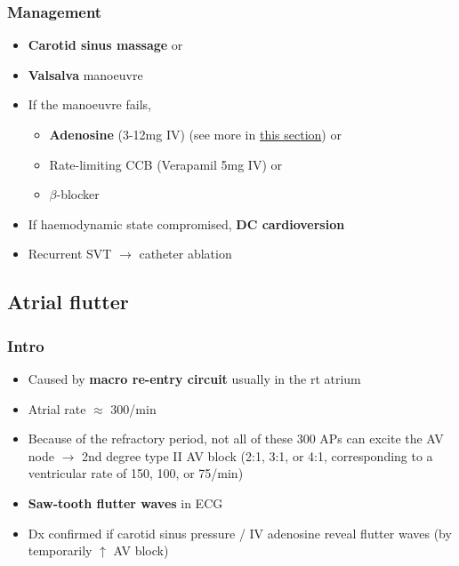 \documentclass[
  12pt,
]{memoir}
\providecommand{\tightlist}{%
  \setlength{\itemsep}{0pt}\setlength{\parskip}{0pt}}
\begin{document}
\hypertarget{management}{%
\subsubsection{Management}\label{management}}

\begin{itemize}
\tightlist
\item
  \textbf{Carotid sinus massage} or
\item
  \textbf{Valsalva} manoeuvre
\item
  If the manoeuvre fails,

  \begin{itemize}
  \tightlist
  \item
    \textbf{Adenosine} (3-12mg IV) (see more in
    \hyperref[ssec:otheranti]{this
       section}) or
  \item
    Rate-limiting CCB (Verapamil 5mg IV) or
  \item
    \(\beta\)-blocker
  \end{itemize}
\item
  If haemodynamic state compromised, \textbf{DC cardioversion}
\item
  Recurrent SVT \(\rightarrow\) catheter ablation
\end{itemize}

\hypertarget{atrial-flutter}{%
\subsection{Atrial flutter}\label{atrial-flutter}}

\hypertarget{intro}{%
\subsubsection{Intro}\label{intro}}

\begin{itemize}
\tightlist
\item
  Caused by \textbf{macro re-entry circuit} usually in the rt atrium
\item
  Atrial rate \(\approx\) 300/min
\item
  Because of the refractory period, not all of these 300 APs can excite
  the AV node \(\rightarrow\) 2nd degree type II AV block (2:1, 3:1, or
  4:1, corresponding to a ventricular rate of 150, 100, or 75/min)
\item
  \textbf{Saw-tooth flutter waves} in ECG
\item
  Dx confirmed if carotid sinus pressure / IV adenosine reveal flutter
  waves (by temporarily \(\uparrow\) AV block)
\end{itemize}
\end{document}

